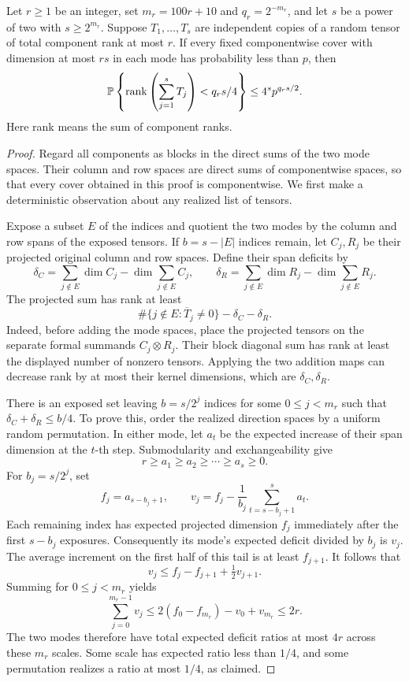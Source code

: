 \begin{lemma}
\label{lem:no-cover-rank}
Let \(r\ge1\) be an integer, set \(m_r=100r+10\) and
\(q_r=2^{-m_r}\), and let \(s\) be a power of two with
\(s\ge2^{m_r}\).  Suppose \(T_1,\ldots,T_s\) are independent copies
of a random tensor of total component rank at most \(r\).
If every fixed componentwise cover with dimension at most \(rs\)
in each mode has probability less than \(p\), then
\begin{equation}
 \mathbb P\left\{\operatorname{rank}\left(\sum_{j=1}^sT_j\right)<q_rs/4\right\}
 \le 4^s p^{q_rs/2}.
 \label{eq:no-cover-rank}
\end{equation}
Here rank means the sum of component ranks.
\end{lemma}

\begin{proof}
Regard all components as blocks in the direct sums of the two mode
spaces.  Their column and row spaces are direct sums of
componentwise spaces, so that every cover obtained in this proof is
componentwise.  We first make a deterministic observation about any
realized list of tensors.

Expose a subset \(E\) of the indices and quotient the two modes by
the column and row spans of the exposed tensors.  If \(b=s-|E|\)
indices remain, let \(C_j,R_j\) be their projected original column
and row spaces.  Define their span deficits by
\[
 \delta_C=\sum_{j\notin E}\dim C_j-\dim\sum_{j\notin E}C_j,\qquad
 \delta_R=\sum_{j\notin E}\dim R_j-\dim\sum_{j\notin E}R_j.
\]
The projected sum has rank at least
\begin{equation}
 \#\{j\notin E:\overline T_j\ne0\}-\delta_C-\delta_R.
 \label{eq:rank-deficits}
\end{equation}
Indeed, before adding the mode spaces, place the projected tensors
on the separate formal summands \(C_j\otimes R_j\).  Their block
diagonal sum has rank at least the displayed number of nonzero
tensors.  Applying the two addition maps can decrease rank by at
most their kernel dimensions, which are \(\delta_C,\delta_R\).

There is an exposed set leaving \(b=s/2^j\) indices for some
\(0\le j<m_r\) such that
\(\delta_C+\delta_R\le b/4\).  To prove this, order the realized
direction spaces by a uniform random permutation.  In either mode,
let \(a_t\) be the expected increase of their span dimension at the
\(t\)-th step.  Submodularity and exchangeability give
\[
 r\ge a_1\ge a_2\ge\cdots\ge a_s\ge0.
\]
For \(b_j=s/2^j\), set
\[
 f_j=a_{s-b_j+1},\qquad
 v_j=f_j-\frac1{b_j}\sum_{t=s-b_j+1}^s a_t.
\]
Each remaining index has expected projected dimension \(f_j\)
immediately after the first \(s-b_j\) exposures.  Consequently its
mode's expected deficit divided by \(b_j\) is \(v_j\).
The average increment on the first half of this tail is at least
\(f_{j+1}\).  It follows that
\[
 v_j\le f_j-f_{j+1}+\tfrac12v_{j+1}.
\]
Summing for \(0\le j<m_r\) yields
\[
 \sum_{j=0}^{m_r-1}v_j
 \le2(f_0-f_{m_r})-v_0+v_{m_r}\le2r.
\]
The two modes therefore have total expected deficit ratios at most
\(4r\) across these \(m_r\) scales.  Some scale has expected ratio
less than \(1/4\), and some permutation realizes a ratio at most
\(1/4\), as claimed.


\end{proof}
